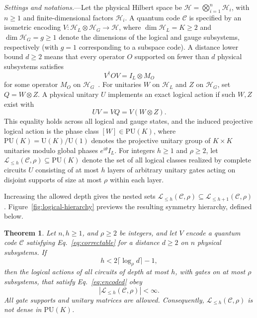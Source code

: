 \documentclass[aps,prl,reprint,notitlepage,nofootinbib,nobibnotes]{revtex4-2}
\newtheorem{theorem}{Theorem}
\newcommand{\HH}{\mathcal H}
\newcommand{\UU}{\mathrm U}
\newcommand{\PU}{\mathrm{PU}}
\newcommand{\id}{I}
\begin{document}
\textit{Settings and notations.}---Let the physical Hilbert space be \(\HH=\bigotimes_{i=1}^{n}\HH_i\), with \(n\ge1\) and finite-dimensional factors \(\HH_i\). A quantum code \(\mathcal C\) is specified by an isometric encoding \(V:\HH_L\otimes\HH_G\longrightarrow\HH\), where \(\dim\HH_L=K\ge2\) and \(\dim\HH_G=g\ge1\) denote the dimensions of the logical and gauge subsystems, respectively (with \(g=1\) corresponding to a subspace code). A distance lower bound \(d\ge 2\) means that every operator \(O\) supported on fewer than \(d\) physical subsystems satisfies
\begin{equation}\label{eq:correctable}
  V^\dagger O V=\id_L\otimes M_O
\end{equation}
for some operator \(M_O\) on \(\HH_G\)~\cite{KL,Kribs,Poulin}. For unitaries \(W\) on \(\HH_L\) and \(Z\) on \(\HH_G\), set \(Q=W\otimes Z\). A physical unitary \(U\) implements an exact logical action if such \(W,Z\) exist with
\begin{equation}\label{eq:encoded}
  UV=VQ=V(W\otimes Z).
\end{equation}
This equality holds across all logical and gauge states, and the induced projective logical action is the phase class \([W]\in\PU(K)\), where \(\PU(K)=\UU(K)/\UU(1)\) denotes the projective unitary group of \(K\times K\) unitaries modulo global phases \(e^{i\theta}\id_L\). For integers \(h\ge1\) and \(\rho\ge2\), let \(\mathcal L_{\le h}(\mathcal C,\rho)\subseteq\PU(K)\) denote the set of all logical classes realized by complete circuits \(U\) consisting of at most \(h\) layers of arbitrary unitary gates acting on disjoint supports of size at most \(\rho\) within each layer.

Increasing the allowed depth gives the nested sets \(\mathcal L_{\le h}(\mathcal C,\rho)\subseteq\mathcal L_{\le h+1}(\mathcal C,\rho)\). Figure~\ref{fig:logical-hierarchy} previews the resulting symmetry hierarchy, defined below.




\begin{samepage}
\begin{theorem}\label{thm:depth}
Let \(n,h\ge 1\), and \(\rho\ge2\) be integers, and let \(V\) encode a quantum code \(\mathcal C\) satisfying Eq.~\eqref{eq:correctable} for a distance \(d\ge2\) on \(n\) physical subsystems. If
\begin{equation}\label{eq:depth}
  h<2\lceil\log_{\rho} d\rceil-1,
\end{equation}
then the logical actions of all circuits of depth at most \(h\), with gates on at most \(\rho\) subsystems, that satisfy Eq.~\eqref{eq:encoded} obey
\[
 |\mathcal L_{\le h}(\mathcal C,\rho)|<\infty.
\]
All gate supports and unitary matrices are allowed. Consequently, \(\mathcal L_{\le h}(\mathcal C,\rho)\) is not dense in \(\PU(K)\).
\end{theorem}
\end{samepage}
\end{document}
